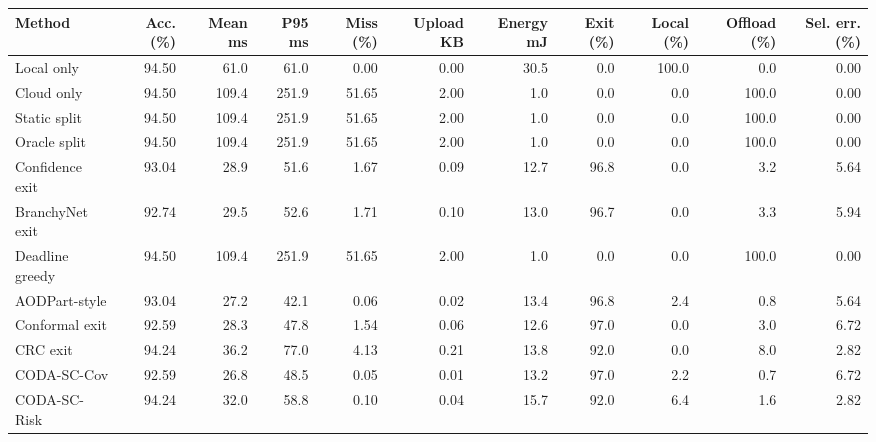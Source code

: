 \begin{tabular}{lrrrrrrrrrr}
\toprule
Method & Acc. (\%) & Mean ms & P95 ms & Miss (\%) & Upload KB & Energy mJ & Exit (\%) & Local (\%) & Offload (\%) & Sel. err. (\%) \\
\midrule
Local only & 94.50 & 61.0 & 61.0 & 0.00 & 0.00 & 30.5 & 0.0 & 100.0 & 0.0 & 0.00 \\
Cloud only & 94.50 & 109.4 & 251.9 & 51.65 & 2.00 & 1.0 & 0.0 & 0.0 & 100.0 & 0.00 \\
Static split & 94.50 & 109.4 & 251.9 & 51.65 & 2.00 & 1.0 & 0.0 & 0.0 & 100.0 & 0.00 \\
Oracle split & 94.50 & 109.4 & 251.9 & 51.65 & 2.00 & 1.0 & 0.0 & 0.0 & 100.0 & 0.00 \\
Confidence exit & 93.04 & 28.9 & 51.6 & 1.67 & 0.09 & 12.7 & 96.8 & 0.0 & 3.2 & 5.64 \\
BranchyNet exit & 92.74 & 29.5 & 52.6 & 1.71 & 0.10 & 13.0 & 96.7 & 0.0 & 3.3 & 5.94 \\
Deadline greedy & 94.50 & 109.4 & 251.9 & 51.65 & 2.00 & 1.0 & 0.0 & 0.0 & 100.0 & 0.00 \\
AODPart-style & 93.04 & 27.2 & 42.1 & 0.06 & 0.02 & 13.4 & 96.8 & 2.4 & 0.8 & 5.64 \\
Conformal exit & 92.59 & 28.3 & 47.8 & 1.54 & 0.06 & 12.6 & 97.0 & 0.0 & 3.0 & 6.72 \\
CRC exit & 94.24 & 36.2 & 77.0 & 4.13 & 0.21 & 13.8 & 92.0 & 0.0 & 8.0 & 2.82 \\
CODA-SC-Cov & 92.59 & 26.8 & 48.5 & 0.05 & 0.01 & 13.2 & 97.0 & 2.2 & 0.7 & 6.72 \\
CODA-SC-Risk & 94.24 & 32.0 & 58.8 & 0.10 & 0.04 & 15.7 & 92.0 & 6.4 & 1.6 & 2.82 \\
\bottomrule
\end{tabular}
